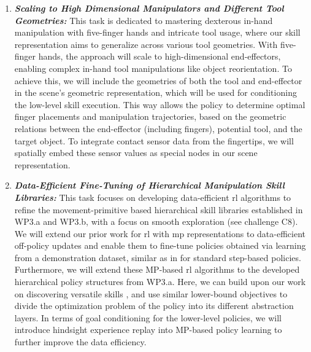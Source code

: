 \documentclass{erc-B2}
\begin{document}
\begin{enumerate}
\item \textit{\textbf{Scaling to High Dimensional Manipulators and Different Tool Geometries:}}
This task is dedicated to mastering dexterous in-hand manipulation with five-finger hands and intricate tool usage, where our skill representation aims to generalize across various tool geometries. 
With five-finger hands, the approach will scale to high-dimensional end-effectors, enabling complex in-hand tool manipulations like object reorientation. To achieve this, we will include the geometries of both the tool and end-effector in the scene's geometric representation, which will be used for conditioning the low-level skill execution. This way allows the policy to determine optimal finger placements and manipulation trajectories, based on the geometric relations between the end-effector (including fingers), potential tool, and the target object. To integrate contact sensor data from the fingertips, we will spatially embed these sensor values as special nodes in our scene representation.

\item \textit{\textbf{Data-Efficient Fine-Tuning of Hierarchical Manipulation Skill Libraries:}}  This task focuses on developing data-efficient \gls*{rl} algorithms to refine the movement-primitive based hierarchical skill libraries established in WP3.a and WP3.b, with a focus on smooth exploration (see challenge C8).
We will extend our prior work for \gls*{rl} with \gls*{mp} representations \cite{li2023tcp,otto2023deep, otto2023mp3} to data-efficient off-policy updates and enable them to fine-tune policies obtained via learning from a demonstration dataset, similar as in \cite{ball2023efficient} for standard step-based policies. Furthermore, we will extend these MP-based \gls*{rl} algorithms to the developed hierarchical policy structures from WP3.a. Here, we can build upon our work on discovering versatile skills \cite{celik2022specializing}, and use similar lower-bound objectives to divide the optimization problem of the policy into its different abstraction layers. In terms of goal conditioning for the lower-level policies, we will introduce hindsight experience replay \cite{NIPS2017_453fadbd} into MP-based policy learning to further improve the data efficiency.



\end{enumerate}
\end{document}
